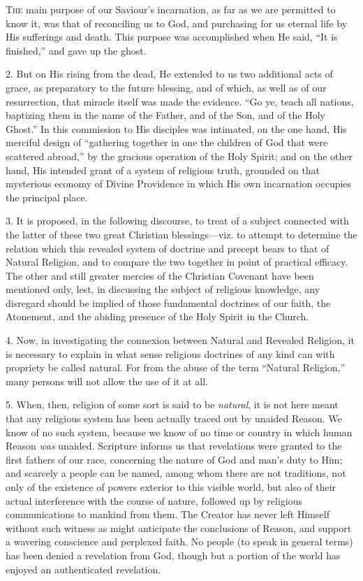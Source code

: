 T\textsc{he} main purpose of our Saviour's incarnation, as far as we are
permitted to know it, was that of reconciling us to God, and
purchasing for us eternal life by His sufferings and death. This
purpose was accomplished when He said, ``It is finished,'' and
gave up the ghost.

2. But on His rising from the dead, He extended to us two
additional acts of grace, as preparatory to the future blessing, and
of which, as well as of our resurrection, that miracle itself was made
the evidence. ``Go ye, teach all nations, baptizing them in the
name of the Father, and of the Son, and of the Holy Ghost.'' In
this commission to His disciples was intimated, on the one hand, His
merciful design of ``gathering together in one the children of God
that were scattered abroad,'' by the gracious operation of the
Holy Spirit; and on the other hand, His intended grant of a system of
religious truth, grounded on that mysterious economy of Divine
Providence in which His own incarnation occupies the principal place.

3. It is proposed, in the following discourse, to treat of a
subject connected with the latter of these two great Christian
blessings—viz. to attempt to determine the relation which this
revealed system of doctrine and precept bears to that of Natural
Religion, and to compare the two together in point of practical
efficacy. The other and still greater mercies of the Christian
Covenant have been mentioned only, lest, in discussing the subject of
religious knowledge, any disregard should be implied of those
fundamental doctrines of our faith, the Atonement, and the abiding
presence of the Holy Spirit in the Church.

4. Now, in investigating the connexion between Natural and Revealed
Religion, it is necessary to explain in what sense religious doctrines
of any kind can with propriety be called natural. For from the abuse
of the term ``Natural Religion,'' many persons will not allow
the use of it at all.

5. When, then, religion of some sort is said to be \emph{natural},
it is not here meant that any religious system has been actually
traced out by unaided Reason. We know of no such system, because we
know of no time or country in which human Reason \emph{was} unaided.
Scripture informs us that revelations were granted to the first
fathers of our race, concerning the nature of God and man's duty to
Him; and scarcely a people can be named, among whom there are not
traditions, not only of the existence of powers exterior to this
visible world, but also of their actual interference with the course
of nature, followed up by religious communications to mankind from
them. The Creator has never left Himself without such witness as might
anticipate the conclusions of Reason, and support a wavering
conscience and perplexed faith. No people (to speak in general terms)
has been denied a revelation from God, though but a portion of the
world has enjoyed an authenticated revelation.

